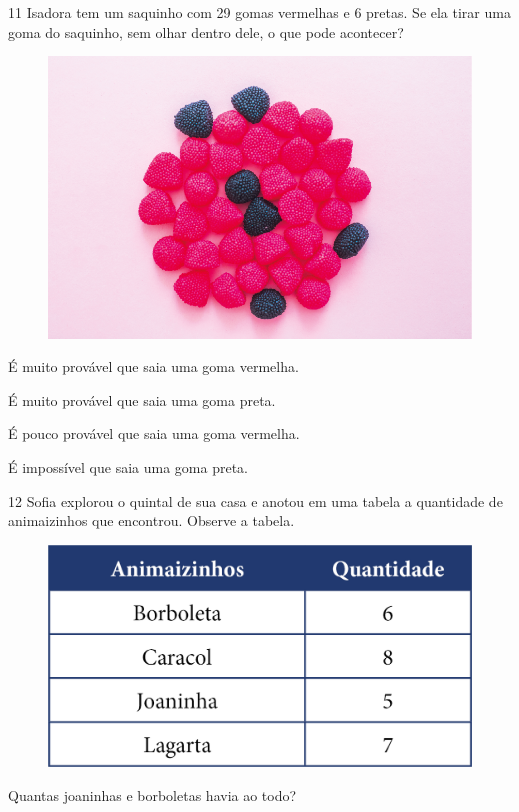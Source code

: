 \pagebreak

\num{11} Isadora tem um saquinho com 29 gomas vermelhas e 6 pretas. Se ela tirar
uma goma do saquinho, sem olhar dentro dele, o que pode acontecer?

\begin{figure}[htpb!]
\centering
\includegraphics[width=.6\textwidth]{./media/image132.png}
\end{figure}

\begin{escolha}
\item É muito provável que saia uma goma vermelha.

\item É muito provável que saia uma goma preta.

\item É pouco provável que saia uma goma vermelha.

\item É impossível que saia uma goma preta.
\end{escolha}


\num{12} Sofia explorou o quintal de sua casa e anotou em uma tabela a quantidade
de animaizinhos que encontrou. Observe a tabela.

\begin{figure}[htpb!]
\centering
\includegraphics[width=.7\textwidth]{./media/image135.png}
\end{figure}

\pagebreak
Quantas joaninhas e borboletas havia ao todo?

